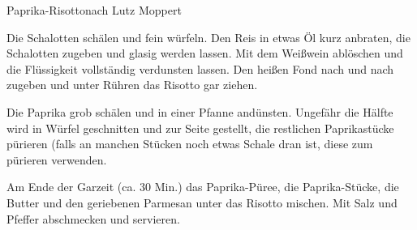 \begin{recipe}{Paprika-Risotto}{nach Lutz Moppert}
  \label{Paprika-Risotto}
  \inglist

  \steps
  Die Schalotten schälen und fein würfeln. Den Reis in etwas Öl kurz anbraten, die 
  Schalotten zugeben und glasig werden lassen. Mit dem Weißwein ablöschen und die
  Flüssigkeit vollständig verdunsten lassen. Den heißen Fond nach und nach zugeben und
  unter Rühren das Risotto gar ziehen.

  Die Paprika grob schälen und in einer Pfanne andünsten. Ungefähr die Hälfte wird in
  Würfel geschnitten und zur Seite gestellt, die restlichen Paprikastücke pürieren (falls
  an manchen Stücken noch etwas Schale dran ist, diese zum pürieren verwenden.

  Am Ende der Garzeit (ca. 30 Min.) das Paprika-Püree, die Paprika-Stücke, die Butter und 
  den geriebenen Parmesan unter das Risotto mischen. Mit Salz und Pfeffer abschmecken und
  servieren.

\end{recipe}
